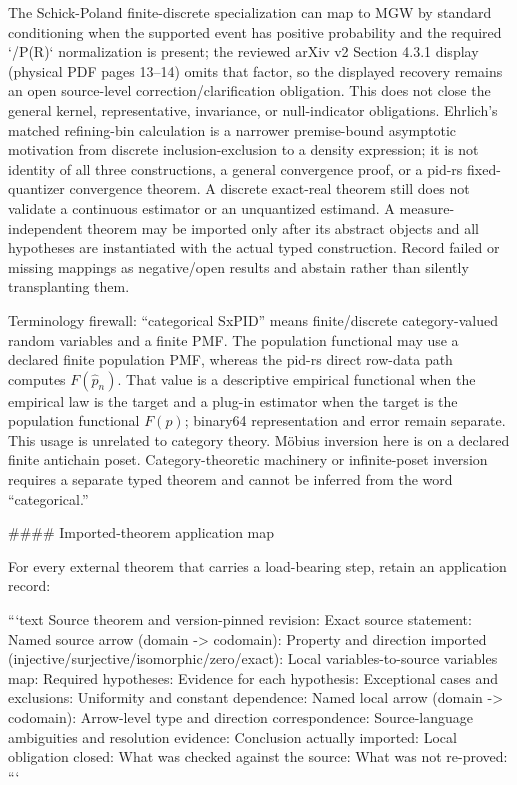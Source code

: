 \documentclass[11pt]{article}
\begin{document}
\begin{markdown}
The Schick-Poland finite-discrete specialization can map to MGW by standard conditioning when the
supported event has positive probability and the required `/P(R)` normalization is present; the
reviewed arXiv v2 Section 4.3.1 display (physical PDF pages 13--14) omits that factor, so the
displayed recovery remains an open source-level correction/clarification obligation.
This does not close the general kernel, representative, invariance, or null-indicator obligations.
Ehrlich's matched refining-bin calculation is a narrower premise-bound asymptotic motivation from
discrete inclusion-exclusion to a density expression; it is not identity of all three constructions,
a general convergence proof, or a pid-rs fixed-quantizer convergence theorem. A discrete exact-real
theorem still does not validate a continuous estimator or an unquantized estimand. A
measure-independent theorem may be imported only after its abstract objects and all hypotheses are
instantiated with the actual typed construction. Record failed or missing mappings as negative/open
results and abstain rather than silently transplanting them.

Terminology firewall: “categorical SxPID” means finite/discrete category-valued random variables
and a finite PMF. The population functional may use a declared finite population PMF, whereas the
pid-rs direct row-data path computes $F(\widehat p_n)$. That value is a descriptive empirical
functional when the empirical law is the target and a plug-in estimator when the target is the
population functional $F(p)$; binary64 representation and error remain separate. This usage is
unrelated to category theory. Möbius inversion here is on a declared finite antichain poset.
Category-theoretic machinery or infinite-poset inversion
requires a separate typed theorem and cannot be inferred from the word “categorical.”

#### Imported-theorem application map

For every external theorem that carries a load-bearing step, retain an application record:

```text
Source theorem and version-pinned revision:
Exact source statement:
Named source arrow (domain -> codomain):
Property and direction imported (injective/surjective/isomorphic/zero/exact):
Local variables-to-source variables map:
Required hypotheses:
Evidence for each hypothesis:
Exceptional cases and exclusions:
Uniformity and constant dependence:
Named local arrow (domain -> codomain):
Arrow-level type and direction correspondence:
Source-language ambiguities and resolution evidence:
Conclusion actually imported:
Local obligation closed:
What was checked against the source:
What was not re-proved:
```


\end{markdown}
\end{document}
